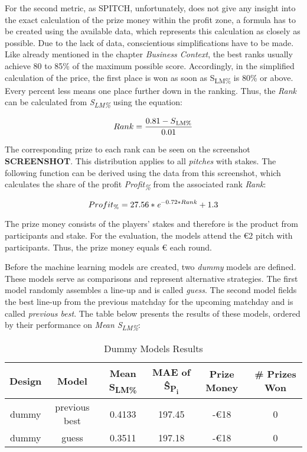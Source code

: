 For the second metric, as SPITCH, unfortunately, does not give any insight into the exact calculation of the prize money within the profit zone, a formula has to be created using the available data, which represents this calculation as closely as possible. Due to the lack of data, conscientious simplifications have to be made. Like already mentioned in the chapter \emph{Business Context}, the best ranks usually achieve 80 to 85\% of the maximum possible score. Accordingly, in the simplified calculation of the price, the first place is won as soon as S\textsubscript{LM\%} is 80\% or above. Every percent less means one place further down in the ranking. Thus, the \emph{Rank} can be calculated from \emph{S\textsubscript{LM\%}} using the equation:

\begin{equation}
    Rank = \frac{0.81 - S\textsubscript{LM\%}}{0.01} 
    \label{eq:percentage_of_best_score_to_rank}
\end{equation}

The corresponding prize to each rank can be seen on the screenshot \textbf{SCREENSHOT}. This distribution applies to all \emph{pitches} with stakes. The following function can be derived using the data from this screenshot, which calculates the share of the profit \emph{Profit\textsubscript{\%}} from the associated rank \emph{Rank}:

\begin{equation}
    Profit\textsubscript{\%} = 27.56 * \emph{e}^{-0.72 * Rank} + 1.3 
    \label{eq:rank_to_profit}
\end{equation}

The prize money consists of the players' stakes and therefore is the product from participants and stake. For the evaluation, the models attend the €2 pitch with  participants. Thus, the prize money equals € each round.

Before the machine learning models are created, two \emph{dummy} models are defined. These models serve as comparisons and represent alternative strategies. The first model randomly assembles a line-up and is called \emph{guess}. The second model fields the best line-up from the previous matchday for the upcoming matchday and is called \emph{previous best}. The table below presents the results of these models, ordered by their performance on \emph{Mean S\textsubscript{LM\%}}:

\begin{table}[H]
    \renewcommand{\arraystretch}{1.0}
    \caption{Dummy Models Results}
    \label{tab:results_of_dummy_models}
    \begin{tabular}{@{}cccccc@{}}
    \toprule
    \textbf{Design} & \textbf{Model} & \textbf{Mean S\textsubscript{LM\%}} & \textbf{MAE of \^{S}\textsubscript{P\textsubscript{i}}} & \textbf{Prize Money} & \textbf{\# Prizes Won} \\ \midrule
    dummy   & previous best & 0.4133 & 197.45 & -€18 & 0 \\
    dummy   & guess         & 0.3511 & 197.18 & -€18 & 0 \\ \bottomrule
    \end{tabular}
\end{table}

